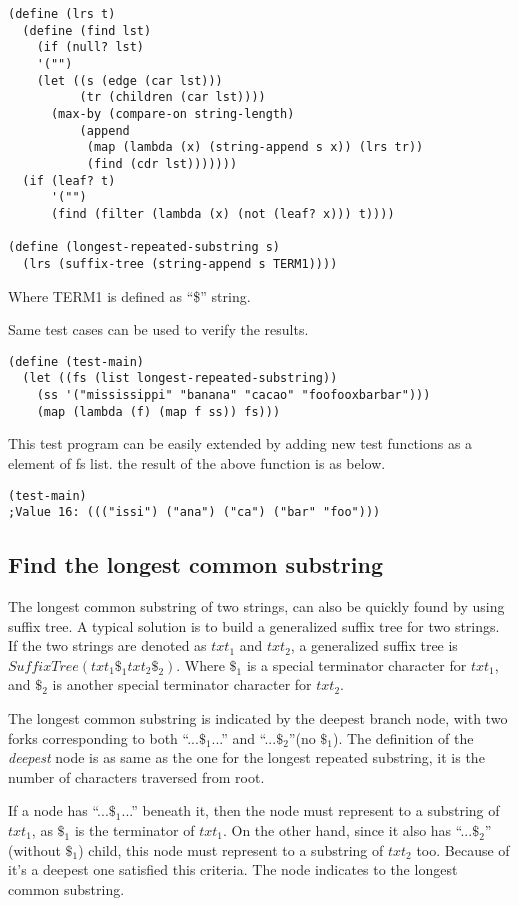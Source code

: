 \documentclass{article}
\begin{document}
\begin{lstlisting}
(define (lrs t)
  (define (find lst)
    (if (null? lst)
	'("")
	(let ((s (edge (car lst)))
	      (tr (children (car lst))))
	  (max-by (compare-on string-length) 
		  (append
		   (map (lambda (x) (string-append s x)) (lrs tr))
		   (find (cdr lst)))))))
  (if (leaf? t)
      '("")
      (find (filter (lambda (x) (not (leaf? x))) t))))

(define (longest-repeated-substring s)
  (lrs (suffix-tree (string-append s TERM1))))
\end{lstlisting}

Where TERM1 is defined as ``\$'' string.

Same test cases can be used to verify the results.

\begin{lstlisting}
(define (test-main)
  (let ((fs (list longest-repeated-substring)) 
	(ss '("mississippi" "banana" "cacao" "foofooxbarbar")))
    (map (lambda (f) (map f ss)) fs)))
\end{lstlisting}

This test program can be easily extended by adding new test
functions as a element of fs list. the result of the above
function is as below.

\begin{lstlisting}
(test-main) 
;Value 16: ((("issi") ("ana") ("ca") ("bar" "foo")))
\end{lstlisting}

\subsection{Find the longest common substring}
The longest common substring of two strings, can also be quickly found
by using suffix tree. A typical solution is to build a generalized suffix
tree for two strings. If the two strings are denoted as $txt_1$ and 
$txt_2$, a generalized suffix tree is $SuffixTree(txt_1\$_1txt_2\$_2)$.
Where $\$_1$ is a special terminator character for $txt_1$, and
$\$_2$ is another special terminator character for $txt_2$.

The longest common substring is indicated by the deepest branch node, with
two forks corresponding to both ``...$\$_1$...'' and ``...$\$_2$''(no $\$_1$).
The definition of the {\em deepest} node is as same as the one for 
the longest repeated substring, it is the number of characters traversed
from root. 

If a node has ``...$\$_1$...'' beneath it, then the node must represent
to a substring of $txt_1$, as $\$_1$ is the terminator of $txt_1$. 
On the other hand, since it also has ``...$\$_2$'' (without $\$_1$) child, this node 
must represent to a substring of $txt_2$ too. Because of it's a deepest
one satisfied this criteria. The node indicates to the longest common
substring.
\end{document}
